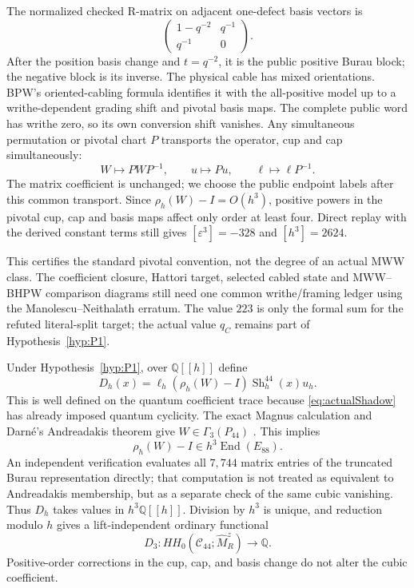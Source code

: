 \documentclass[11pt]{amsart}
\theoremstyle{definition}
\theoremstyle{remark}
\newcommand{\Q}{\mathbb{Q}}
\begin{document}
The normalized checked R-matrix on adjacent one-defect basis vectors is
\[
\begin{pmatrix}1-q^{-2}&q^{-1}\\q^{-1}&0\end{pmatrix}.
\]
After the position basis change and $t=q^{-2}$, it is the public positive
Burau block; the negative block is its inverse.  The physical cable has mixed
orientations.  BPW's oriented-cabling formula identifies it with the
all-positive model up to a writhe-dependent grading shift and pivotal basis
maps.  The complete public word has writhe zero, so its own conversion shift
vanishes.  Any simultaneous permutation or pivotal chart $P$ transports the
operator, cup and cap simultaneously:
\[
W\mapsto PWP^{-1},\qquad u\mapsto Pu,\qquad
\ell\mapsto\ell P^{-1}.
\]
The matrix coefficient is unchanged; we choose the public endpoint labels
after this common transport.  Since $\rho_h(W)-I=O(h^3)$, positive powers in
the pivotal cup, cap and basis maps affect only order at least four.  Direct
replay with the derived constant terms still gives
$[\varepsilon^3]=-328$ and $[h^3]=2624$.

This certifies the standard pivotal convention, not the degree of an actual
MWW class.  The coefficient closure, Hattori target, selected cabled state and
MWW--BHPW comparison diagrams still need one common writhe/framing ledger
using the Manolescu--Neithalath erratum.  The value $223$ is only the formal
sum for the refuted literal-split target; the actual value $q_C$ remains part
of Hypothesis~\ref{hyp:P1}.

Under Hypothesis~\ref{hyp:P1}, over $\Q[[h]]$ define
\[
D_h(x)=\ell_h(\rho_h(W)-I)\operatorname{Sh}^{44}_h(x)u_h.
\]
This is well defined on the quantum coefficient trace because
\eqref{eq:actualShadow} has already imposed quantum cyclicity.  The exact
Magnus calculation and Darn\'e's Andreadakis theorem give
$W\in\Gamma_3(P_{44})$ \cite[Theorem~6.2]{Darne2021}.  This implies
\[
\rho_h(W)-I\in h^3\operatorname{End}(E_{88}).
\]
An independent verification evaluates all $7{,}744$ matrix entries of the
truncated Burau representation directly; that computation is not treated as
equivalent to Andreadakis membership, but as a separate check of the same
cubic vanishing.
Thus $D_h$ takes values in $h^3\Q[[h]]$.  Division by $h^3$ is unique, and
reduction modulo $h$ gives a lift-independent ordinary functional
\[
D_3:HH_0(\mathcal C_{44};\widehat M_R^z)\longrightarrow\Q.
\]
Positive-order corrections in the cup, cap, and basis change do not alter
the cubic coefficient.
\end{document}
